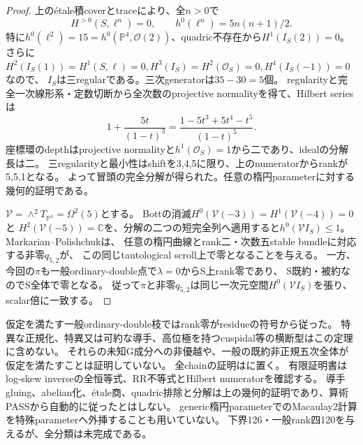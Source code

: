 \documentclass[a4paper,11pt]{ltjsarticle}
\theoremstyle{definition}
\begin{document}
\begin{proof}
上のétale積coverとtraceにより、全$n>0$で
\[
 H^{>0}(S,\ell^n)=0,\qquad h^0(\ell^n)=5n(n+1)/2.
\]
特に$h^0(\ell^2)=15=h^0(\mathbb P^4,\mathcal O(2))$、quadric不存在から$H^1(I_S(2))=0$。
さらに$H^2(I_S(1))=H^1(S,\ell)=0,H^3(I_S)=H^2(\mathcal O_S)=0,H^4(I_S(-1))=0$なので、
$I_S$は三regularである。三次generatorは$35-30=5$個。
regularityと完全一次線形系・定数切断から全次数のprojective normalityを得て、Hilbert seriesは
\[
 1+\frac{5t}{(1-t)^3}
       =\frac{1-5t^3+5t^4-t^5}{(1-t)^5}.
\]
座標環のdepthはprojective normalityと$h^1(\mathcal O_S)=1$から二であり、idealの分解長は二。
三regularityと最小性はshiftを3,4,5に限り、上のnumeratorからrankが5,5,1となる。
よって冒頭の完全分解が得られた。任意の楕円parameterに対する幾何的証明である。

$\mathcal V=\wedge^2T_{\mathbb P^4}=\Omega^2(5)$とする。
Bottの消滅$H^0(\mathcal V(-3))=H^1(\mathcal V(-4))=0$と
$H^2(\mathcal V(-5))=\mathbb C$を、分解の二つの短完全列へ適用すると$h^0(\mathcal V I_S)\le1$。
Markarian--Polishchuk\cite[\S3.2, Lemmas 3.2.1,3.2.3]{mpq52}は、
任意の楕円曲線とrank二・次数五stable bundleに対応する非零$q_{5,2}$が、
この同じtautological scroll上で零となることを与える。
一方、今回の$\pi$も一般ordinary-double点で$\lambda=0$からS上rank零であり、
S既約・被約なのでS全体で零となる。
従って$\pi$と非零$q_{5,2}$は同じ一次元空間$H^0(\mathcal V I_S)$を張り、scalar倍に一致する。
\end{proof}

仮定を満たす一般ordinary-double枝ではrank零がresidueの符号から従った。
特異な正規化、特異又は可約な導手、高位極を持つcuspidal等の横断型はこの定理に含めない。
それらの未知G成分への非優越や、一般の既約非正規五次全体が仮定を満たすことは証明していない。
全chainの証明はに置く。
有限証明書は
log-skew inverseの全恒等式、RR不等式とHilbert numeratorを確認する。
導手gluing、abelian化、étale商、quadric排除と分解は上の幾何的証明であり、算術PASSから自動的に従ったとはしない。
generic楕円parameterでのMacaulay2計算を特殊parameterへ外挿することも用いていない。
下界126・一般rank四120を与えるが、全分類は未完成である。
\end{document}
